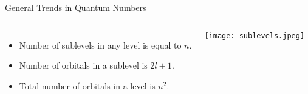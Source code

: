 \documentclass[notes=onlyslideswithnotes,notes=hide]{beamer}
\begin{document}
\begin{frame}{General Trends in Quantum Numbers}
	\begin{columns}
	\begin{itemize}
		\item Number of sublevels in any level is equal to $n$.
		\item Number of orbitals in a sublevel is $2l + 1$.
		\item Total number of orbitals in a level is $n^2$.
	\end{itemize}
	\begin{center}
		\texttt{[image: sublevels.jpeg]}
	\end{center}
	\end{columns}
\end{frame}
\end{document}
